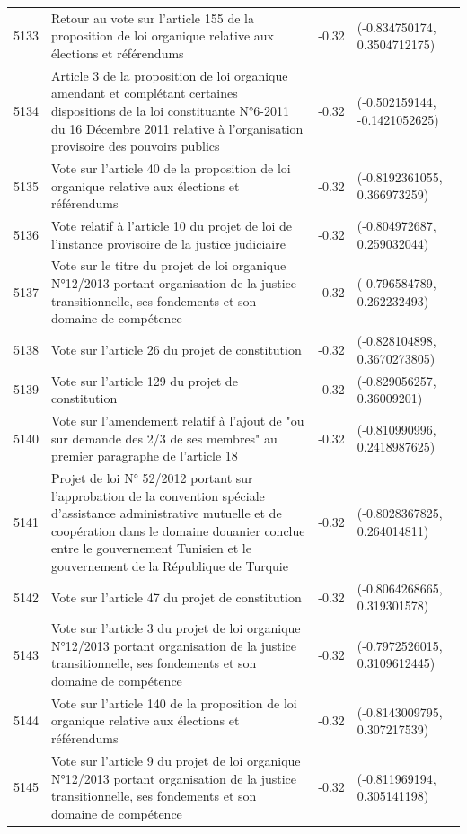 \begin{table}[ht]
\begin{tabular}{rlrl}
  5133 & Retour au vote sur l'article 155 de la proposition de loi organique relative aux élections et référendums & -0.32 & (-0.834750174, 0.3504712175) \\ 
  5134 & Article 3 de la proposition de loi organique amendant et complétant certaines dispositions de la loi constituante N°6-2011 du 16 Décembre 2011 relative à l'organisation provisoire des pouvoirs publics & -0.32 & (-0.502159144, -0.1421052625) \\ 
  5135 & Vote sur l'article 40 de la proposition de loi organique relative aux élections et référendums & -0.32 & (-0.8192361055, 0.366973259) \\ 
  5136 & Vote relatif à l'article 10 du projet de loi de l'instance provisoire de la justice judiciaire & -0.32 & (-0.804972687, 0.259032044) \\ 
  5137 & Vote sur le titre du projet de loi organique N°12/2013 portant organisation de la justice transitionnelle, ses fondements et son domaine de compétence & -0.32 & (-0.796584789, 0.262232493) \\ 
  5138 & Vote sur l'article 26 du projet de constitution & -0.32 & (-0.828104898, 0.3670273805) \\ 
  5139 & Vote sur l'article 129 du projet de constitution & -0.32 & (-0.829056257, 0.36009201) \\ 
  5140 & Vote sur l'amendement relatif à l'ajout de "ou sur demande des 2/3 de ses membres" au premier paragraphe de l'article 18 & -0.32 & (-0.810990996, 0.2418987625) \\ 
  5141 & Projet de loi N° 52/2012 portant sur l'approbation de la convention spéciale d'assistance administrative mutuelle et de coopération dans le domaine douanier conclue entre le gouvernement Tunisien et le gouvernement de la République de Turquie & -0.32 & (-0.8028367825, 0.264014811) \\ 
  5142 & Vote sur l'article 47 du projet de constitution & -0.32 & (-0.8064268665, 0.319301578) \\ 
  5143 & Vote sur l'article 3 du projet de loi organique N°12/2013 portant organisation de la justice transitionnelle, ses fondements et son domaine de compétence & -0.32 & (-0.7972526015, 0.3109612445) \\ 
  5144 & Vote sur l'article 140 de la proposition de loi organique relative aux élections et référendums & -0.32 & (-0.8143009795, 0.307217539) \\ 
  5145 & Vote sur l'article 9 du projet de loi organique N°12/2013 portant organisation de la justice transitionnelle, ses fondements et son domaine de compétence & -0.32 & (-0.811969194, 0.305141198) \\ 

\end{tabular}
\end{table}
